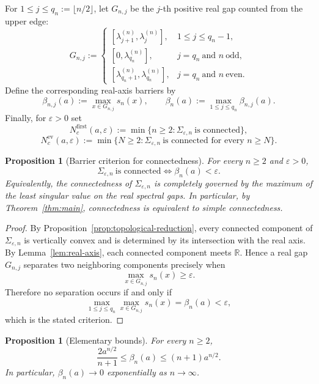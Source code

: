 \documentclass[11pt]{article}
\numberwithin{equation}{section}
\newtheorem{proposition}[theorem]{Proposition}
\begin{document}
For \(1\le j\le q_n:=\lfloor n/2\rfloor\), let \(G_{n,j}\) be the \(j\)-th positive
real gap counted from the upper edge:
\[
G_{n,j}:=
\begin{cases}
[\lambda_{j+1}^{(n)},\lambda_j^{(n)}],& 1\le j\le q_n-1,\\[1mm]
[0,\lambda_{q_n}^{(n)}],& j=q_n\ \text{and }n\ \text{odd},\\[1mm]
[\lambda_{q_n+1}^{(n)},\lambda_{q_n}^{(n)}],& j=q_n\ \text{and }n\ \text{even}.
\end{cases}
\]
Define the corresponding real-axis barriers by
\[
\beta_{n,j}(a):=\max_{x\in G_{n,j}} s_n(x),
\qquad
\beta_n(a):=\max_{1\le j\le q_n}\beta_{n,j}(a).
\]
Finally, for \(\varepsilon>0\) set
\[
N_c^{\mathrm{first}}(a,\varepsilon)
:=
\min\{n\ge2:\Sigma_{\varepsilon,n}\ \text{is connected}\},
\]
\[
N_c^{\mathrm{ev}}(a,\varepsilon)
:=
\min\{N\ge2:\Sigma_{\varepsilon,n}\ \text{is connected for every }n\ge N\}.
\]

\begin{proposition}[Barrier criterion for connectedness]
\label{prop:barrier-criterion}
For every \(n\ge2\) and \(\varepsilon>0\),
\[
\Sigma_{\varepsilon,n}\ \text{is connected}
\iff
\beta_n(a)<\varepsilon.
\]
Equivalently, the connectedness of \(\Sigma_{\varepsilon,n}\) is completely governed by
the maximum of the least singular value on the real spectral gaps.
In particular, by Theorem~\ref{thm:main}, connectedness is equivalent to
simple connectedness.
\end{proposition}

\begin{proof}
By Proposition~\ref{prop:topological-reduction}, every connected component of
\(\Sigma_{\varepsilon,n}\) is vertically convex and is determined by its intersection
with the real axis. By Lemma~\ref{lem:real-axis}, each connected component meets
\(\mathbb R\). Hence a real gap \(G_{n,j}\) separates two neighboring components
precisely when
\[
\max_{x\in G_{n,j}}s_n(x)\ge\varepsilon.
\]
Therefore no separation occurs if and only if
\[
\max_{1\le j\le q_n}\max_{x\in G_{n,j}}s_n(x)=\beta_n(a)<\varepsilon,
\]
which is the stated criterion.
\end{proof}

\begin{proposition}[Elementary bounds]
\label{prop:beta-rough}
For every \(n\ge2\),
\[
\frac{2a^{n/2}}{n+1}\le \beta_n(a)\le (n+1)a^{n/2}.
\]
In particular, \(\beta_n(a)\to0\) exponentially as \(n\to\infty\).
\end{proposition}
\end{document}
